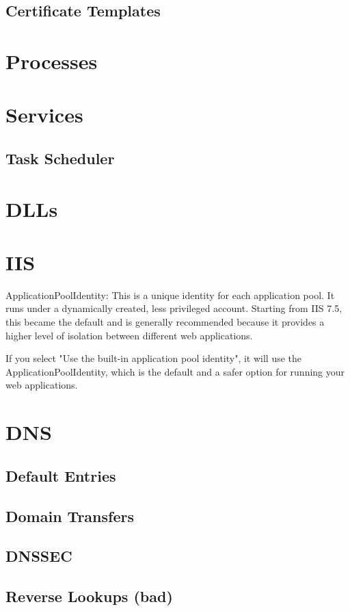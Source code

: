 \subsection{Certificate Templates}

\section{Processes}

\section{Services}
\subsection{Task Scheduler}

\section{DLLs}

\section{IIS}
ApplicationPoolIdentity: This is a unique identity for each application pool. It runs under a dynamically created, less privileged account. Starting from IIS 7.5, this became the default and is generally recommended because it provides a higher level of isolation between different web applications.

If you select "Use the built-in application pool identity", it will use the ApplicationPoolIdentity, which is the default and a safer option for running your web applications.

\section{DNS}
\subsection{Default Entries}
\subsection{Domain Transfers}
\subsection{DNSSEC}
\subsection{Reverse Lookups (bad)}
